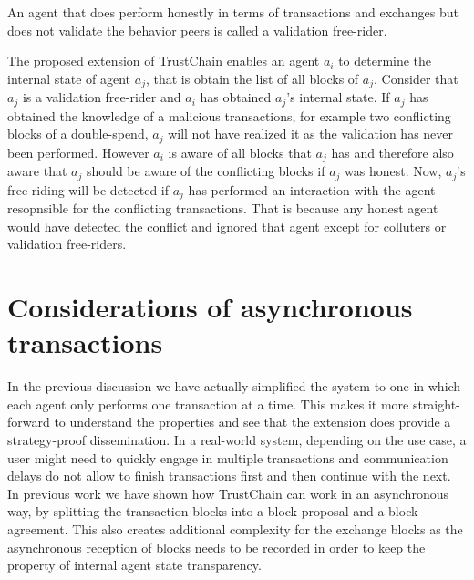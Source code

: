 \begin{defn}
    An agent that does perform honestly in terms of transactions and exchanges but does not validate
    the behavior peers is called a validation free-rider.
\end{defn}

The proposed extension of TrustChain enables an agent $a_i$ to determine the internal state of agent
$a_j$, that is obtain the list of all blocks of $a_j$. Consider that $a_j$ is a validation free-rider
and $a_i$ has obtained $a_j$'s internal state. If $a_j$ has obtained the knowledge of a malicious 
transactions, for example two conflicting blocks of a double-spend, $a_j$ will not have realized it 
as the validation has never been performed. However $a_i$ is aware of all blocks that $a_j$ has and 
therefore also aware that $a_j$ should be aware of the conflicting blocks if $a_j$ was honest. Now, 
$a_j$'s free-riding will be detected if $a_j$ has performed an interaction with the agent resopnsible
for the conflicting transactions. That is because any honest agent would have detected the conflict 
and ignored that agent except for colluters or validation free-riders. 

\section{Considerations of asynchronous transactions}
In the previous discussion we have actually simplified the system to one in which each agent only 
performs one transaction at a time. This makes it more straight-forward to understand the properties
and see that the extension does provide a strategy-proof dissemination. In a real-world system,
depending on the use case, a user might need to quickly engage in multiple transactions and 
communication delays do not allow to finish transactions first and then continue with the next. In 
previous work we have shown how TrustChain can work in an asynchronous way, by splitting the 
transaction blocks into a block proposal and a block agreement. This also creates additional 
complexity for the exchange blocks as the asynchronous reception of blocks needs to be recorded in
order to keep the property of internal agent state transparency.

\begin{defn}
\end{defn}

\section{}